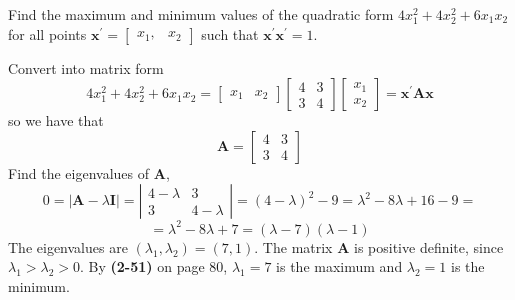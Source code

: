         Find the maximum and minimum values of the quadratic form $4x_1^2 + 4x_2^2 + 6x_1x_2$ for all points $\mathbf{x}^\prime = \begin{bmatrix}
            x_1, & x_2
        \end{bmatrix}$ such that $\mathbf{x}^\prime\mathbf{x}^\prime = 1$.
        \newline
        \par
        Convert into matrix form
        \[
            4x_1^2 + 4x_2^2 + 6x_1x_2
            =
            \begin{bmatrix}
                x_1 & x_2
            \end{bmatrix}
            \begin{bmatrix}
                4 & 3 \\
                3 & 4
            \end{bmatrix}
            \begin{bmatrix}
                x_1 \\
                x_2
            \end{bmatrix}
            =
            \textbf{x}^\prime\textbf{A}\textbf{x}
        \]
        so we have that
        \[
            \textbf{A}
            =
            \begin{bmatrix}
                4 & 3 \\
                3 & 4
            \end{bmatrix}
        \]
        Find the eigenvalues of $\textbf{A}$,
        \[
            0 = \left|\textbf{A} - \lambda\textbf{I}\right|
            =
            \left|
            \begin{matrix}
                4-\lambda & 3 \\
                3 & 4-\lambda
            \end{matrix}
            \right|
            =
            {\left(4-\lambda\right)}^2 - 9
            =
            \lambda^2 - 8\lambda + 16 - 9
            =
        \]
        \[
            =
            \lambda^2 - 8\lambda + 7
            =
            \left(\lambda - 7\right)\left(\lambda - 1\right)
        \]
        The eigenvalues are $(\lambda_1, \lambda_2) = (7, 1)$. The matrix $\textbf{A}$ is positive definite, since $\lambda_1 > \lambda_2 > 0$.
        By \textbf{(2-51)} on page 80, $\lambda_1 = 7$ is the maximum and $\lambda_2 = 1$ is the minimum.